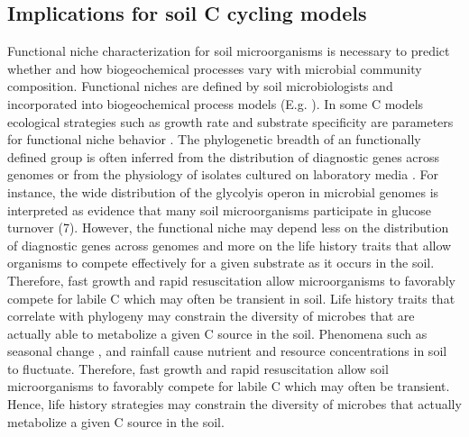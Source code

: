 \subsection{Implications for soil C cycling models}
Functional niche characterization for soil microorganisms is necessary to
predict whether and how biogeochemical processes vary with microbial community
composition. Functional niches are defined by soil microbiologists and
incorporated into biogeochemical process models (E.g.
\citep{wieder_2014a,Kaiser2014a}). In some C models ecological strategies such
as growth rate and substrate specificity are parameters for functional niche
behavior \citep{Kaiser2014a}. The phylogenetic breadth of an functionally
defined group is often inferred from the distribution of diagnostic genes
across genomes \citep{Berlemont2013} or from the physiology of isolates
cultured on laboratory media \citep{Martiny2013}. For instance, the wide
distribution of the glycolyis operon in microbial genomes is interpreted as
evidence that many soil microorganisms participate in glucose turnover (7).
However, the functional niche may depend less on the distribution of diagnostic
genes across genomes and more on the life history traits that allow organisms
to compete effectively for a given substrate as it occurs in the soil.
Therefore, fast growth and rapid resuscitation allow microorganisms to
favorably compete for labile C which may often be transient in soil. Life
history traits that correlate with phylogeny may constrain the diversity of
microbes that are actually able to metabolize a given C source in the soil.
Phenomena such as seasonal change \citep{Schmidt2007}, and rainfall
\citep{Evans2014a} cause nutrient and resource concentrations in soil to
fluctuate. Therefore, fast growth and rapid resuscitation allow soil
microorganisms to favorably compete for labile C which may often be transient.
Hence, life history strategies may constrain the diversity of microbes that
actually metabolize a given C source in the soil. 


